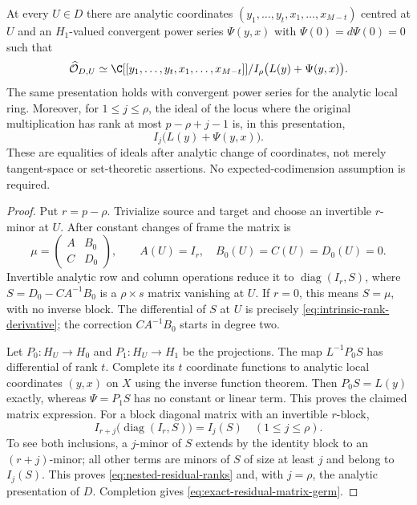 \begin{theorem}\label{thm:residual-matrix-germ}
At every $U\in D$ there are analytic coordinates
$(y_1,\ldots,y_t,x_1,\ldots,x_{M-t})$ centred at $U$ and an
$H_1$-valued convergent power series $\Psi(y,x)$ with
$\Psi(0)=d\Psi(0)=0$ such that
\begin{equation}\label{eq:exact-residual-matrix-germ}
 \widehat{\mathcal O}_{D,U}\simeq
 \C[[y_1,\ldots,y_t,x_1,\ldots,x_{M-t}]]
                  /I_\rho\bigl(L(y)+\Psi(y,x)\bigr).
\end{equation}
The same presentation holds with convergent power series for the
analytic local ring. Moreover, for $1\le j\le\rho$, the ideal of
the locus where the original multiplication has rank at most
$p-\rho+j-1$ is, in this presentation,
\begin{equation}\label{eq:nested-residual-ranks}
 I_j\bigl(L(y)+\Psi(y,x)\bigr).
\end{equation}
These are equalities of ideals after analytic change of coordinates,
not merely tangent-space or set-theoretic assertions. No
expected-codimension assumption is required.
\end{theorem}
\begin{proof}
Put $r=p-\rho$. Trivialize source and target and choose an invertible
$r$-minor at $U$. After constant changes of frame the matrix is
\[
 \mu=\begin{pmatrix}A&B_0\\ C&D_0\end{pmatrix},\qquad
 A(U)=I_r,\quad B_0(U)=C(U)=D_0(U)=0.
\]
Invertible analytic row and column operations reduce it to
$\operatorname{diag}(I_r,S)$, where
$S=D_0-CA^{-1}B_0$ is a $\rho\times s$ matrix vanishing at $U$.
If $r=0$, this means $S=\mu$, with no inverse block. The differential
of $S$ at $U$ is precisely \eqref{eq:intrinsic-rank-derivative};
the correction $CA^{-1}B_0$ starts in degree two.

Let $P_0:H_U\to H_0$ and $P_1:H_U\to H_1$ be the projections.
The map $L^{-1}P_0S$ has differential of rank $t$. Complete its
$t$ coordinate functions to analytic local coordinates $(y,x)$ on
$X$ using the inverse function theorem. Then $P_0S=L(y)$ exactly,
whereas $\Psi=P_1S$ has no constant or linear term. This proves the
claimed matrix expression. For a block diagonal matrix with an
invertible $r$-block,
\[
 I_{r+j}\bigl(\operatorname{diag}(I_r,S)\bigr)=I_j(S)
               \quad(1\le j\le\rho).
\]
To see both inclusions, a $j$-minor of $S$ extends by the identity
block to an $(r+j)$-minor; all other terms are minors of $S$ of size
at least $j$ and belong to $I_j(S)$. This proves
\eqref{eq:nested-residual-ranks} and, with $j=\rho$, the analytic
presentation of $D$. Completion gives
\eqref{eq:exact-residual-matrix-germ}.
\end{proof}

